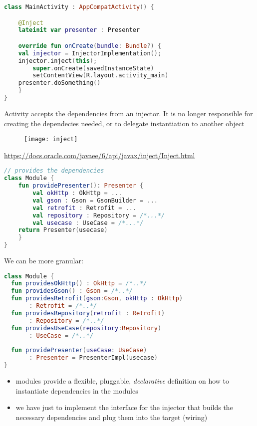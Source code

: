 \documentclass[10pt]{beamer}
\begin{document}
\begin{frame}[fragile]
\begin{lstlisting}[language=Kotlin, basicstyle=\ttfamily]
class MainActivity : AppCompatActivity() {

    @Inject
    lateinit var presenter : Presenter

    override fun onCreate(bundle: Bundle?) {
	val injector = InjectorImplementation();
	injector.inject(this);  
        super.onCreate(savedInstanceState)
        setContentView(R.layout.activity_main)
	presenter.doSomething()
    }
}
\end{lstlisting} 
	 Activity accepts the dependencies from an injector. 
	 It is no longer responsible for creating the dependecies needed,
	 or to delegate instantiation to another object
\end{frame}
\begin{frame}[fragile]
	\begin{figure}
		\centering
		\texttt{[image: inject]}
	\end{figure}
	\url{https://docs.oracle.com/javaee/6/api/javax/inject/Inject.html}
\end{frame}
\begin{frame}[fragile]
\begin{lstlisting}[language=Kotlin, basicstyle=\ttfamily]
// provides the dependencies 
class Module {
    fun providePresenter(): Presenter {
        val okHttp : OkHttp = ...
        val gson : Gson = GsonBuilder = ...
        val retrofit : Retrofit = ...
        val repository : Repository = /*...*/
        val usecase : UseCase = /*...*/
	return Presenter(usecase) 
    }
}
\end{lstlisting} 
\end{frame}
\begin{frame}[fragile]
	We can be more granular:
\begin{lstlisting}[language=Kotlin, basicstyle=\ttfamily]
class Module {
  fun providesOkHttp() : OkHttp = /*..*/
  fun providesGson() : Gson = /*..*/
  fun providesRetrofit(gson:Gson, okHttp : OkHttp) 
       : Retrofit = /*..*/
  fun providesRepository(retrofit : Retrofit) 
       : Repository = /*..*/
  fun providesUseCase(repository:Repository) 
       : UseCase = /*..*/
    
  fun providePresenter(useCase: UseCase) 
       : Presenter = PresenterImpl(usecase) 
}
\end{lstlisting} 
\end{frame}
\begin{frame}
	\begin{itemize}
		\item modules provide a flexible, pluggable, \emph{declarative} definition on how to instantiate dependencies in the modules 
		\item we have just to implement the interface for the injector that builds the necessary dependencies and plug them into the target (wiring) 
	\end{itemize}
\end{frame}
\end{document}
